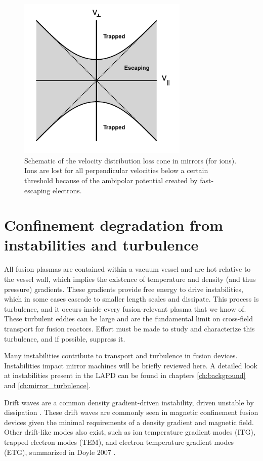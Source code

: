 \begin{figure}
	\centering
	\includegraphics[width=230pt]{figures/loss-cone.pdf}
	\caption[The mirror machine loss cone]{\label{fig:loss-cone}Schematic of the velocity distribution loss cone in mirrors (for ions). Ions are lost for all perpendicular velocities below a certain threshold because of the ambipolar potential created by fast-escaping electrons.}
\end{figure}

\section{Confinement degradation from instabilities and turbulence}

All fusion plasmas are contained within a vacuum vessel and are hot relative to the vessel wall, which implies the existence of temperature and density (and thus pressure) gradients. These gradients provide free energy to drive instabilities, which in some cases cascade to smaller length scales and dissipate. This process is turbulence, and it occurs inside every fusion-relevant plasma that we know of. These turbulent eddies can be large and are the fundamental limit on cross-field transport for fusion reactors. Effort must be made to study and characterize this turbulence, and if possible, suppress it. 

Many instabilities contribute to transport and turbulence in fusion devices. Instabilities impact mirror machines will be briefly reviewed here. A detailed look at instabilities present in the LAPD can be found in chapters \ref{ch:background} and \ref{ch:mirror_turbulence}.

Drift waves are a common density gradient-driven instability, driven unstable by dissipation \cite{hendel_collisional_1968, Horton_1999, Tynan_review_2009}. These drift waves are commonly seen in magnetic confinement fusion devices given the minimal requirements of a density gradient and magnetic field. Other drift-like modes also exist, such as ion temperature gradient modes (ITG), trapped electron modes (TEM), and electron temperature gradient modes (ETG), summarized in Doyle 2007 \cite{physics_chapter_2007}.

